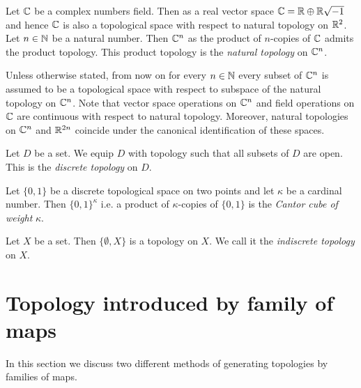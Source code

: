\begin{example}\label{example:complex_numbers}
	Let ${\mathbb C}$ be a complex numbers field. Then as a real vector space ${\mathbb C} = {\mathbb R} \oplus {\mathbb R}\sqrt{-1}$ and hence ${\mathbb C}$ is also a topological space with respect to natural topology on ${\mathbb R}^2$. Let $n \in {\mathbb N}$ be a natural number. Then ${\mathbb C}^n$ as the product of $n$-copies of ${\mathbb C}$ admits the product topology. This product topology is the \textit{natural topology} on ${\mathbb C}^n$.
\end{example}
\noindent
Unless otherwise stated, from now on for every $n \in {\mathbb N}$ every subset of ${\mathbb C}^n$ is assumed to be a topological space with respect to subspace of the natural topology on ${\mathbb C}^n$. Note that vector space operations on ${\mathbb C}^n$ and field operations on ${\mathbb C}$ are continuous with respect to natural topology. Moreover, natural topologies on ${\mathbb C}^n$ and ${\mathbb R}^{2n}$ coincide under the canonical identification of these spaces.

\begin{example}\label{example:discrete_topology}
	Let $D$ be a set. We equip $D$ with topology such that all subsets of $D$ are open. This is the \textit{discrete topology} on $D$.
\end{example}

\begin{example}\label{example:Cantor_space}
	Let $\{0,1\}$ be a discrete topological space on two points and let $\kappa$ be a cardinal number. Then $\{0,1\}^{\kappa}$ i.e. a product of $\kappa$-copies of $\{0,1\}$ is the \textit{Cantor cube of weight} $\kappa$.
\end{example}

\begin{example}\label{example:indiscrete_topology}
	Let $X$ be a set. Then $\{\emptyset, X\}$ is a topology on $X$. We call it the \textit{indiscrete topology} on $X$.
\end{example}

\section{Topology introduced by family of maps}
\noindent
In this section we discuss two different methods of generating topologies by families of maps.

